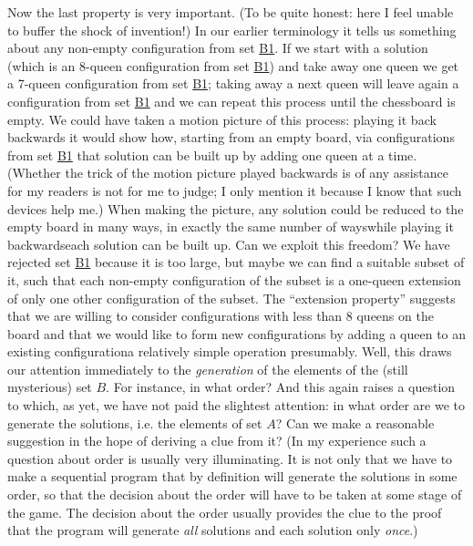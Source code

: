 Now the last property is very important. (To be quite honest: here I feel unable to buffer the shock of invention!) In our earlier terminology it tells us something about any non-empty configuration from set \hyperref[en:b1-eight-queens]{B1}. If we start with a solution (which is an 8-queen configuration from set \hyperref[en:b1-eight-queens]{B1}) and take away one queen we get a 7-queen configuration from set \hyperref[en:b1-eight-queens]{B1}; taking away a next queen will leave again a configuration from set \hyperref[en:b1-eight-queens]{B1} and we can repeat this process until the chessboard is empty. We could have taken a motion picture of this process: playing it back backwards it would show how, starting from an empty board, via configurations from set \hyperref[en:b1-eight-queens]{B1} that solution can be built up by adding one queen at a time. (Whether the trick of the motion picture played backwards is of any assistance for my readers is not for me to judge; I only mention it because I know that such devices help me.) When making the picture, any solution could be reduced to the empty board in many ways, in exactly the same number of ways\textemdash{}while playing it backwards\textemdash{}each solution can be built up. Can we exploit this freedom? We have rejected set \hyperref[en:b1-eight-queens]{B1} because it is too large, but maybe we can find a suitable subset of it, such that each non-empty configuration of the subset is a one-queen extension of only one other configuration of the subset. The ``extension property'' suggests that we are willing to consider configurations with less than 8 queens on the board and that we would like to form new configurations by adding a queen to an existing configuration\textemdash{}a relatively simple operation presumably. Well, this draws our attention immediately to the \textit{generation} of the elements of the (still mysterious) set $B$. For instance, in what order? And this again raises a question to which, as yet, we have not paid the slightest attention: in what order are we to generate the solutions, i.e. the elements of set $A$? Can we make a reasonable suggestion in the hope of deriving a clue from it? (In my experience such a question about order is usually very illuminating. It is not only that we have to make a sequential program that by definition will generate the solutions in some order, so that the decision about the order will have to be taken at some stage of the game. The decision about the order usually provides the clue to the proof that the program will generate \textit{all} solutions and each solution only \textit{once}.)

